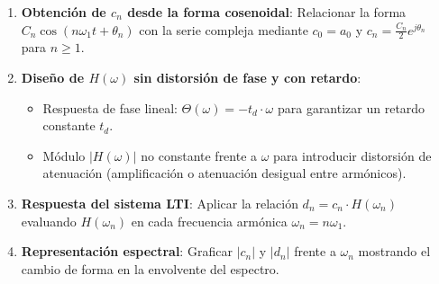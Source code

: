 \begin{mecanizado}
\begin{enumerate}
    \item \textbf{Obtención de $c_n$ desde la forma cosenoidal}: Relacionar la forma $C_n \cos(n\omega_1 t + \theta_n)$ con la serie compleja mediante $c_0 = a_0$ y $c_n = \frac{C_n}{2} e^{j\theta_n}$ para $n \ge 1$.
    \item \textbf{Diseño de $H(\omega)$ sin distorsión de fase y con retardo}:
    \begin{itemize}
        \item Respuesta de fase lineal: $\Theta(\omega) = -t_d \cdot \omega$ para garantizar un retardo constante $t_d$.
        \item Módulo $|H(\omega)|$ no constante frente a $\omega$ para introducir distorsión de atenuación (amplificación o atenuación desigual entre armónicos).
    \end{itemize}
    \item \textbf{Respuesta del sistema LTI}: Aplicar la relación $d_n = c_n \cdot H(\omega_n)$ evaluando $H(\omega_n)$ en cada frecuencia armónica $\omega_n = n\omega_1$.
    \item \textbf{Representación espectral}: Graficar $|c_n|$ y $|d_n|$ frente a $\omega_n$ mostrando el cambio de forma en la envolvente del espectro.
\end{enumerate}
\end{mecanizado}

